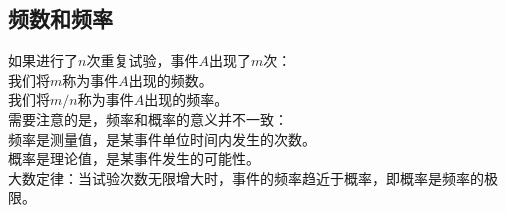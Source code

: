 \documentclass[UTF8]{ctexart}
\begin{document}
\subsection{频数和频率}
    如果进行了$n$次重复试验，事件$A$出现了$m$次：\\[3mm]
    我们将$m$称为事件$A$出现的频数。\\[2mm]
    我们将$m/n$称为事件$A$出现的频率。\\[4mm]
    需要注意的是，频率和概率的意义并不一致：\\[3mm]
    频率是测量值，是某事件单位时间内发生的次数。\\[2mm]
    概率是理论值，是某事件发生的可能性。\\[4mm]
    大数定律：当试验次数无限增大时，事件的频率趋近于概率，即概率是频率的极限。
\end{document}
